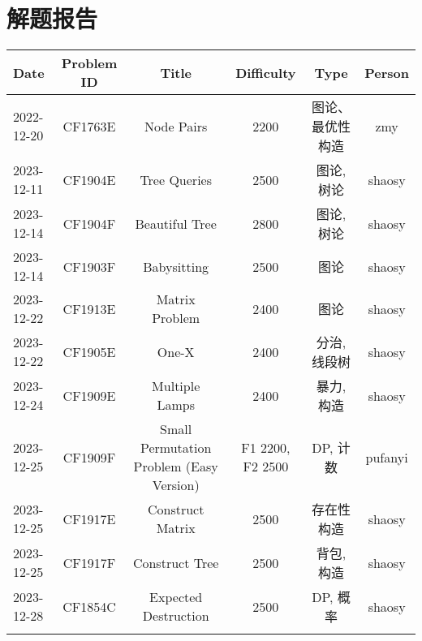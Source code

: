 \chapter{解题报告}
\begin{center}
\begin{longtable}{l c c c c c }

Date & Problem ID & Title & Difficulty & Type & Person   \\ 
\hline
2022-12-20 & CF1763E & Node Pairs & 2200 & 图论、最优性构造 & zmy  \\
2023-12-11 & CF1904E & Tree Queries & 2500 & 图论, 树论 & shaosy \\
2023-12-14 & CF1904F & Beautiful Tree & 2800 & 图论, 树论 & shaosy \\
2023-12-14 & CF1903F & Babysitting & 2500 & 图论 & shaosy \\
2023-12-22 & CF1913E & Matrix Problem & 2400 & 图论 & shaosy \\
2023-12-22 & CF1905E & One-X & 2400 & 分治, 线段树 & shaosy \\
2023-12-24 & CF1909E & Multiple Lamps & 2400 & 暴力, 构造 & shaosy \\
2023-12-25 & CF1909F & Small Permutation Problem (Easy Version) & F1 2200, F2 2500 & DP, 计数 & pufanyi \\
2023-12-25 & CF1917E & Construct Matrix & 2500 & 存在性构造 & shaosy \\
2023-12-25 & CF1917F & Construct Tree & 2500 & 背包, 构造 & shaosy \\
2023-12-28 & CF1854C & Expected Destruction & 2500 & DP, 概率 & shaosy \\
\hline

\label{tab:practice_index}
\end{longtable}
\end{center}


